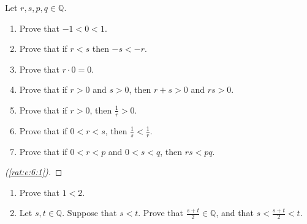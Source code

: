 \Newpage
\begin{exercise} %
	\label{rat:e:6}
	Let ${r, s, p, q \in \mathbb{Q}}$.
	\begin{enumerate}
		\item Prove that $-1 < 0 < 1$. \label{rat:e:6:1}
		\item Prove that if $r < s$ then $-s < -r$. \label{rat:e:6:2}
		\item Prove that $r \cdot 0 = 0$. \label{rat:e:6:3}
		\item Prove that if $r > 0$ and $s > 0$, then $r + s > 0$ and $r s > 0$. \label{rat:e:6:4}
		\item Prove that if $r > 0$, then $\frac{1}{r} > 0$. \label{rat:e:6:5}
		\item Prove that if $0 < r < s$, then $\frac{1}{s} < \frac{1}{r}$. \label{rat:e:6:6}
		\item Prove that if $0 < r < p$ and $0 < s < q$, then $r s < p q$. \label{rat:e:6:7}
	\end{enumerate}
\end{exercise}

\begin{proof}[(\ref{rat:e:6:1})]
	\TBD
\end{proof}








\Newpage
\begin{exercise} %
	\label{rat:e:7}
	\hfill
	\begin{enumerate}
		\item Prove that $1 < 2$. \label{rat:e:7:1}
		\item Let $s, t \in \mathbb{Q}$. Suppose that $s < t$. Prove that $\frac{s + t}{2} \in \mathbb{Q}$, and that $s < \frac{s + t}{2} < t$. \label{rat:e:7:2}
	\end{enumerate}
\end{exercise}

